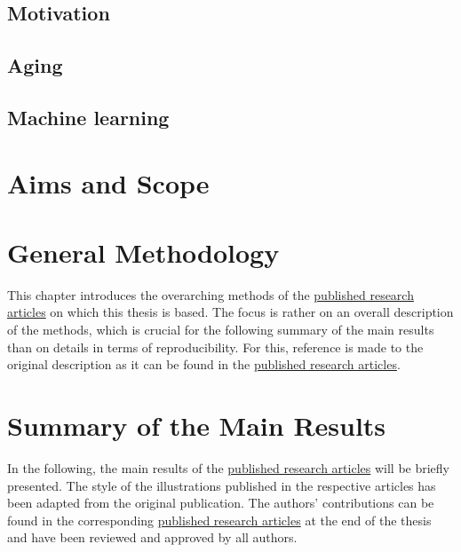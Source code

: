 \documentclass[oneside]{book}
\begin{document}
        \section{Motivation}
        \label{motivation}
        
        
    
        \section{Aging}
        \label{theory:aging}
            
        
        \section{Machine learning}
        \label{theory:ml}
         

    \chapter{Aims and Scope}
    \label{chap:aims_scope}
    

    \chapter{General Methodology}
    \label{chap:methods}
    This chapter introduces the overarching methods of the \hyperref[pub:papers]{published research articles} on which this thesis is based. The focus is rather on an overall description of the methods, which is crucial for the following summary of the main results than on details in terms of reproducibility. For this, reference is made to the original description as it can be found in the \hyperref[pub:papers]{published research articles}.
    
    
    \chapter{Summary of the Main Results}
    \label{chap:results}
    In the following, the main results of the \hyperref[pub:papers]{published research articles} will be briefly presented. The style of the illustrations published in the respective articles has been adapted from the original publication. The authors' contributions can be found in the corresponding \hyperref[pub:papers]{published research articles} at the end of the thesis and have been reviewed and approved by all authors.
    
\end{document}
